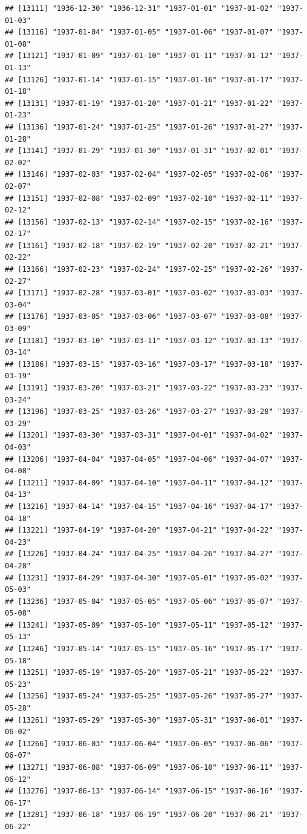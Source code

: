 \documentclass{article}\usepackage[]{graphicx}\usepackage[]{color}
\makeatletter
\newenvironment{kframe}{%
 \def\at@end@of@kframe{}%
 \ifinner\ifhmode%
  \def\at@end@of@kframe{\end{minipage}}%
  \begin{minipage}{\columnwidth}%
 \fi\fi%
 \def\FrameCommand##1{\hskip\@totalleftmargin \hskip-\fboxsep
 \colorbox{shadecolor}{##1}\hskip-\fboxsep
     \hskip-\linewidth \hskip-\@totalleftmargin \hskip\columnwidth}%
 \MakeFramed {\advance\hsize-\width
   \@totalleftmargin\z@ \linewidth\hsize
   \@setminipage}}%
 {\par\unskip\endMakeFramed%
 \at@end@of@kframe}
\newenvironment{knitrout}{}{} %
\makeatother
\begin{document}
\begin{description}
\begin{knitrout}
\begin{kframe}
\begin{verbatim}
## [13111] "1936-12-30" "1936-12-31" "1937-01-01" "1937-01-02" "1937-01-03"
## [13116] "1937-01-04" "1937-01-05" "1937-01-06" "1937-01-07" "1937-01-08"
## [13121] "1937-01-09" "1937-01-10" "1937-01-11" "1937-01-12" "1937-01-13"
## [13126] "1937-01-14" "1937-01-15" "1937-01-16" "1937-01-17" "1937-01-18"
## [13131] "1937-01-19" "1937-01-20" "1937-01-21" "1937-01-22" "1937-01-23"
## [13136] "1937-01-24" "1937-01-25" "1937-01-26" "1937-01-27" "1937-01-28"
## [13141] "1937-01-29" "1937-01-30" "1937-01-31" "1937-02-01" "1937-02-02"
## [13146] "1937-02-03" "1937-02-04" "1937-02-05" "1937-02-06" "1937-02-07"
## [13151] "1937-02-08" "1937-02-09" "1937-02-10" "1937-02-11" "1937-02-12"
## [13156] "1937-02-13" "1937-02-14" "1937-02-15" "1937-02-16" "1937-02-17"
## [13161] "1937-02-18" "1937-02-19" "1937-02-20" "1937-02-21" "1937-02-22"
## [13166] "1937-02-23" "1937-02-24" "1937-02-25" "1937-02-26" "1937-02-27"
## [13171] "1937-02-28" "1937-03-01" "1937-03-02" "1937-03-03" "1937-03-04"
## [13176] "1937-03-05" "1937-03-06" "1937-03-07" "1937-03-08" "1937-03-09"
## [13181] "1937-03-10" "1937-03-11" "1937-03-12" "1937-03-13" "1937-03-14"
## [13186] "1937-03-15" "1937-03-16" "1937-03-17" "1937-03-18" "1937-03-19"
## [13191] "1937-03-20" "1937-03-21" "1937-03-22" "1937-03-23" "1937-03-24"
## [13196] "1937-03-25" "1937-03-26" "1937-03-27" "1937-03-28" "1937-03-29"
## [13201] "1937-03-30" "1937-03-31" "1937-04-01" "1937-04-02" "1937-04-03"
## [13206] "1937-04-04" "1937-04-05" "1937-04-06" "1937-04-07" "1937-04-08"
## [13211] "1937-04-09" "1937-04-10" "1937-04-11" "1937-04-12" "1937-04-13"
## [13216] "1937-04-14" "1937-04-15" "1937-04-16" "1937-04-17" "1937-04-18"
## [13221] "1937-04-19" "1937-04-20" "1937-04-21" "1937-04-22" "1937-04-23"
## [13226] "1937-04-24" "1937-04-25" "1937-04-26" "1937-04-27" "1937-04-28"
## [13231] "1937-04-29" "1937-04-30" "1937-05-01" "1937-05-02" "1937-05-03"
## [13236] "1937-05-04" "1937-05-05" "1937-05-06" "1937-05-07" "1937-05-08"
## [13241] "1937-05-09" "1937-05-10" "1937-05-11" "1937-05-12" "1937-05-13"
## [13246] "1937-05-14" "1937-05-15" "1937-05-16" "1937-05-17" "1937-05-18"
## [13251] "1937-05-19" "1937-05-20" "1937-05-21" "1937-05-22" "1937-05-23"
## [13256] "1937-05-24" "1937-05-25" "1937-05-26" "1937-05-27" "1937-05-28"
## [13261] "1937-05-29" "1937-05-30" "1937-05-31" "1937-06-01" "1937-06-02"
## [13266] "1937-06-03" "1937-06-04" "1937-06-05" "1937-06-06" "1937-06-07"
## [13271] "1937-06-08" "1937-06-09" "1937-06-10" "1937-06-11" "1937-06-12"
## [13276] "1937-06-13" "1937-06-14" "1937-06-15" "1937-06-16" "1937-06-17"
## [13281] "1937-06-18" "1937-06-19" "1937-06-20" "1937-06-21" "1937-06-22"

\end{verbatim}
\end{kframe}
\end{knitrout}
\end{description}
\end{document}
